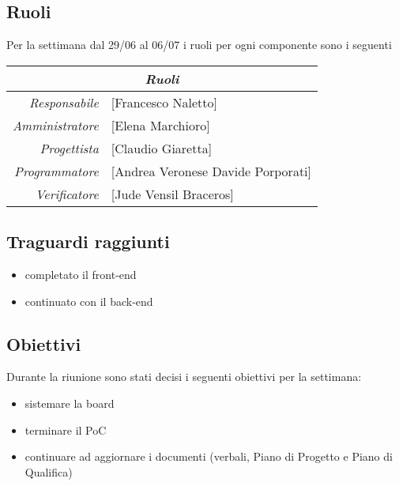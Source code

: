 \documentclass[12pt]{article}
\begin{document}
\subsection{Ruoli}
Per la settimana dal 29/06 al 06/07 i ruoli per ogni componente sono i seguenti
\\
\begin{tabular}{r | l}
    \multicolumn{2}{c}{\textit{Ruoli}}\\
    \hline
        \textit{Responsabile} &
        [Francesco Naletto]\makecell{}\\
        \textit{Amministratore} &
        [Elena Marchioro]\makecell{}\\
        \textit{Progettista} &
        [Claudio Giaretta]\makecell{}\\
        \textit{Programmatore} &
        [Andrea Veronese Davide Porporati]\makecell{}\\
        \textit{Verificatore} & 
        [Jude Vensil Braceros]\makecell{}\\
\end{tabular}

\subsection{Traguardi raggiunti}
\begin{itemize}
    \item completato il front-end
    \item continuato con il back-end
    
    
\end{itemize}

\subsection{Obiettivi}
Durante la riunione sono stati decisi i seguenti obiettivi per la settimana:
\begin{itemize}
    \item sistemare la board
    \item terminare il PoC
    \item continuare ad aggiornare i documenti (verbali, Piano di Progetto e Piano di Qualifica)
    
    
\end{itemize}
\end{document}

